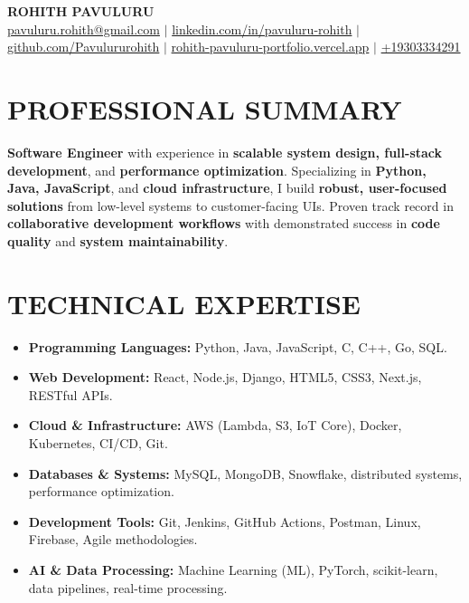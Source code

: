 \documentclass[letterpaper,20pt]{article}
\newcommand{\resumeItem}[2]{
  \item\small{
    \textbf{}{#2 \vspace{-2pt}}
  }
}
\newcommand{\resumeSubItem}[2]{\resumeItem{#1}{#2}\vspace{-3pt}}
\newcommand{\resumeSubHeadingListStart}{\begin{itemize}[leftmargin=*]}
\newcommand{\resumeSubHeadingListEnd}{\end{itemize}}
\begin{document}
\begin{center}
    \textbf{\Large ROHITH PAVULURU} \\ \vspace{2pt}
    \small
    \href{mailto:pavuluru.rohith@gmail.com}{pavuluru.rohith@gmail.com} $|$ 
    \href{https://linkedin.com/in/pavuluru-rohith}{linkedin.com/in/pavuluru-rohith} $|$
    \href{https://github.com/Pavulururohith}{github.com/Pavulururohith} $|$
    \href{https://rohith-pavuluru-portfolio.vercel.app}{rohith-pavuluru-portfolio.vercel.app} $|$ 
    \href{tel:+19303334291}{+19303334291}
\end{center}
\vspace{-10pt}

\section{PROFESSIONAL SUMMARY}
    \small{\textbf{Software Engineer} with experience in \textbf{scalable system design, full-stack development}, and \textbf{performance optimization}. Specializing in \textbf{Python, Java, JavaScript}, and \textbf{cloud infrastructure}, I build \textbf{robust, user-focused solutions} from low-level systems to customer-facing UIs. Proven track record in \textbf{collaborative development workflows} with demonstrated success in \textbf{code quality} and \textbf{system maintainability}.}
\vspace{-2pt}

\section{TECHNICAL EXPERTISE}
\resumeSubHeadingListStart
\resumeSubItem{}{\small\textbf{Programming Languages:} Python, Java, JavaScript, C, C++, Go, SQL.}
\resumeSubItem{}{\small\textbf{Web Development:} React, Node.js, Django, HTML5, CSS3, Next.js, RESTful APIs.}
\resumeSubItem{}{\small\textbf{Cloud \& Infrastructure:} AWS (Lambda, S3, IoT Core), Docker, Kubernetes, CI/CD, Git.}
\resumeSubItem{}{\small\textbf{Databases \& Systems:} MySQL, MongoDB, Snowflake, distributed systems, performance optimization.}
\resumeSubItem{}{\small\textbf{Development Tools:} Git, Jenkins, GitHub Actions, Postman, Linux, Firebase, Agile methodologies.}
\resumeSubItem{}{\small\textbf{AI \& Data Processing:} Machine Learning (ML), PyTorch, scikit-learn, data pipelines, real-time processing.}
\resumeSubHeadingListEnd
\vspace{-3pt}
\end{document}
